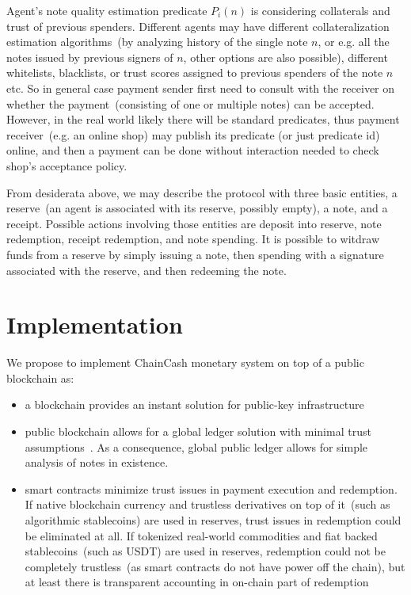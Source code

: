 \documentclass{llncs}   %
\newcommand{\cc}{ChainCash}
\begin{document}
Agent's note quality estimation predicate $P_i(n)$ is considering collaterals and trust of previous spenders. Different agents may have different 
collateralization estimation algorithms~(by analyzing history of the single note $n$, or e.g. all the notes issued by previous signers of $n$, other options are also possible), different whitelists, blacklists, or trust scores assigned to previous spenders of the note $n$ etc. So in general case payment sender first need to consult with the receiver on whether the payment~(consisting of one or multiple notes) can be accepted. However, in the real world likely there will be standard predicates, thus payment receiver~(e.g. an online shop) may publish its predicate (or just predicate id) online, and then a payment can be done without interaction needed to check shop's acceptance policy.

From desiderata above, we may describe the protocol with three basic entities, a reserve~(an agent is associated with its
reserve, possibly empty), a note, and a receipt. Possible actions involving those entities are deposit into reserve, note redemption,
 receipt redemption, and note spending. It is possible to witdraw funds from a reserve by simply issuing a note, then spending with a signature
associated with the reserve, and then redeeming the note.

\section{Implementation}
\label{sec-impl}

We propose to implement \cc{} monetary system on top of a public blockchain as:

\begin{itemize}
  \item{} a blockchain provides an instant solution for public-key infrastructure
  \item{} public blockchain allows for a global ledger solution with minimal trust assumptions~\cite{kya}. As a consequence, global public ledger allows for simple analysis of notes in existence.
  \item{} smart contracts minimize trust issues in payment execution and redemption. If native blockchain currency and trustless derivatives on top of it~(such as algorithmic stablecoins) are used in reserves, trust issues in redemption could be eliminated at all. If tokenized real-world commodities and fiat backed stablecoins~(such as USDT) are used in reserves, redemption could not be completely trustless~(as smart contracts do not have power off the chain), but at least there is transparent accounting in on-chain part of redemption
\end{itemize}
\end{document}
